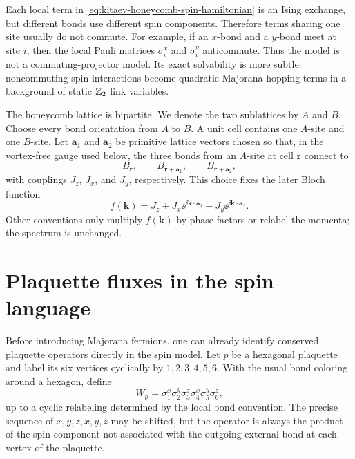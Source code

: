 \begin{remark}
Each local term in \cref{eq:kitaev-honeycomb-spin-hamiltonian} is an Ising
exchange, but different bonds use different spin components.  Therefore terms
sharing one site usually do not commute.  For example, if an \(x\)-bond and a
\(y\)-bond meet at site \(i\), then the local Pauli matrices
\(\sigma_i^x\) and \(\sigma_i^y\) anticommute.  Thus the model is not a
commuting-projector model.  Its exact solvability is more subtle: noncommuting
spin interactions become quadratic Majorana hopping terms in a background of
static \(\mathbb{Z}_2\) link variables.
\end{remark}

The honeycomb lattice is bipartite.  We denote the two sublattices by
\(A\) and \(B\).  Choose every bond orientation from \(A\) to \(B\).  A unit cell
contains one \(A\)-site and one \(B\)-site.  Let \(\bm a_1\) and \(\bm a_2\) be
primitive lattice vectors chosen so that, in the vortex-free gauge used below,
the three bonds from an \(A\)-site at cell \(\bm r\) connect to
\begin{equation}
\label{eq:honeycomb-neighbour-convention}
    B_{\bm r},
    \qquad
    B_{\bm r+\bm a_1},
    \qquad
    B_{\bm r+\bm a_2},
\end{equation}
with couplings \(J_z\), \(J_x\), and \(J_y\), respectively.  This choice fixes
the later Bloch function
\begin{equation}
\label{eq:kitaev-bloch-function-def-preview}
    f(\bm k)=J_z+J_x\ee^{\ii \bm k\cdot \bm a_1}
             +J_y\ee^{\ii \bm k\cdot \bm a_2} .
\end{equation}
Other conventions only multiply \(f(\bm k)\) by phase factors or relabel the
momenta; the spectrum is unchanged.

\section{Plaquette fluxes in the spin language}
\label{sec:kitaev-spin-fluxes}

Before introducing Majorana fermions, one can already identify conserved
plaquette operators directly in the spin model.  Let \(p\) be a hexagonal
plaquette and label its six vertices cyclically by \(1,2,3,4,5,6\).  With the
usual bond coloring around a hexagon, define
\begin{equation}
\label{eq:kitaev-plaquette-spin-operator}
    W_p
    =
    \sigma_1^x\sigma_2^y\sigma_3^z
    \sigma_4^x\sigma_5^y\sigma_6^z,
\end{equation}
up to a cyclic relabeling determined by the local bond convention.  The precise
sequence of \(x,y,z,x,y,z\) may be shifted, but the operator is always the
product of the spin component not associated with the outgoing external bond at
each vertex of the plaquette.

